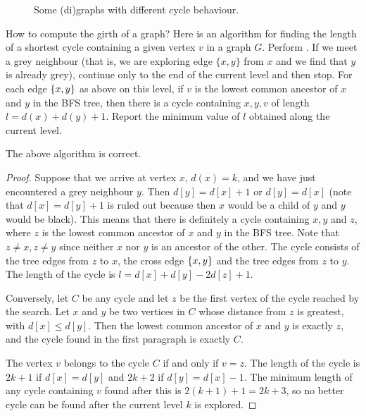 \begin{figure}

\centerline{}
\caption{Some (di)graphs with different cycle behaviour.}
\label{fig:cycle}
\end{figure}

How to compute the girth of a graph? Here is an algorithm for finding
the length of a shortest cycle containing a given vertex $v$ in a graph
$G$. Perform . If we meet a grey neighbour (that is,
we are exploring edge $\{x, y\}$ from $x$ and we find that $y$ is already
grey), continue only to the end of the current level and then stop. For
each edge $\mbox{$\{x, y\}$}$ as above on this level, if $v$ is the lowest
common ancestor of $x$ and $y$ in the BFS tree, then there is a cycle
containing $x, y, v$ of length $l=d(x) + d(y) + 1$. Report the minimum
value of $l$ obtained along the current level.

\begin{Theorem}
\label{thm:BFS-cycle} 
The above algorithm is correct.
\end{Theorem}

\begin{proof}
Suppose that we arrive at vertex $x$, $d(x) = k$, and we have just
encountered a grey neighbour $y$. Then $d[y] = d[x] + 1$ or $d[y] = d[x]$
(note that $d[x] = d[y] + 1$ is ruled out because then $x$ would be a
child of $y$ and $y$ would be black). This means that there is definitely
a cycle containing $x, y$ and $z$, where $z$ is the lowest common ancestor
of $x$ and $y$ in the BFS tree. Note that $z\neq x, z\neq y$ since neither
$x$ nor $y$ is an ancestor of the other. The cycle consists of the tree
edges from $z$ to $x$, the cross edge $\mbox{$\{x,y\}$}$ and the tree edges
from $z$ to $y$. The length of the cycle is $l=d[x] + d[y] - 2 d[z] + 1$.

Conversely, let $C$ be any cycle and let $z$ be the first vertex of
the cycle reached by the search. Let $x$ and $y$ be two vertices in $C$
whose distance  from $z$ is greatest, with $d[x] \leq d[y]$. Then the
lowest common ancestor of  $x$ and $y$ is exactly $z$, and the cycle
found in the first paragraph is exactly $C$.

The vertex $v$ belongs to the cycle $C$ if and only if $v = z$. The
length of the cycle is $2k+1$ if $d[x] = d[y]$ and $2k+2$ if $d[y] =
d[x] - 1$. The minimum length of any cycle containing $v$ found after
this is $2(k+1) + 1 = 2k+3$, so no better cycle can be found after the
current level $k$ is explored.
\end{proof}

